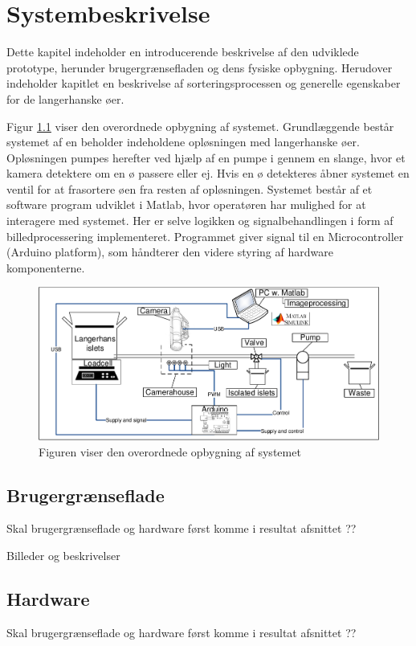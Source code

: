 \chapter{Systembeskrivelse}
Dette kapitel indeholder en introducerende beskrivelse af den udviklede prototype, herunder brugergrænsefladen og dens fysiske opbygning. Herudover indeholder kapitlet en beskrivelse af sorteringsprocessen og generelle egenskaber for de langerhanske øer.

Figur \ref{fig:system} viser den overordnede opbygning af systemet. Grundlæggende består systemet af en beholder indeholdene opløsningen med langerhanske øer. Opløsningen pumpes herefter ved hjælp af en pumpe i gennem en slange, hvor et kamera detektere om en ø passere eller ej. Hvis en ø detekteres åbner systemet en ventil for at frasortere øen fra resten af opløsningen. Systemet består af et software program udviklet i Matlab, hvor operatøren har mulighed for at interagere med systemet. Her er selve logikken og signalbehandlingen i form af billedprocessering implementeret. Programmet giver signal til en Microcontroller (Arduino platform), som håndterer den videre styring af hardware komponenterne.

\begin{figure}[H]
	\centering
	\includegraphics[width=1\textwidth]{billeder/DMTS.pdf}
	\caption{Figuren viser den overordnede opbygning af systemet}
	\label{fig:system}
\end{figure}
%
%


\section{Brugergrænseflade}
Skal brugergrænseflade og hardware først komme i resultat afsnittet ?? 

Billeder og beskrivelser

\section{Hardware}
Skal brugergrænseflade og hardware først komme i resultat afsnittet ?? 

